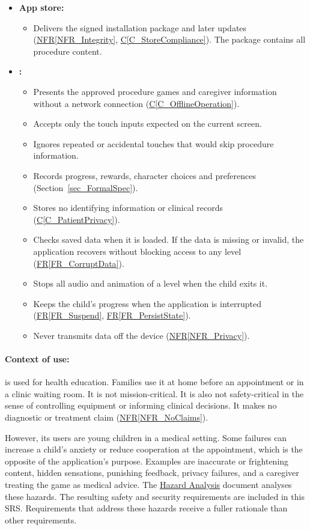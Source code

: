 \documentclass[10pt]{article}
\makeatletter
\newcommand{\conref}[1]{\hyperref[#1]{C\ref*{#1}}}
\newcommand{\termsecnum}{\ifnum\value{subsection}=0 \thesection\else\thesubsection\fi}
\newcommand{\termmark}[1]{%
  \hypertarget{term:#1}{}%
  \protected@write\@auxout{}{\string\newlabel{termsec:#1}{{\termsecnum}{\thepage}{}{}{}}}%
}
\newcommand{\rref}[1]{\hyperref[#1]{FR\ref*{#1}}}
\newcommand{\nfrref}[1]{\hyperref[#1]{NFR\ref*{#1}}}
\newcommand{\haurl}{https://team-hindsight.github.io/ophthamology-game/HazardAnalysis/HazardAnalysis.pdf}
\newcommand{\hadoc}[1]{\href{\haurl}{#1}}
\makeatother
\begin{document}
\begin{itemize}
\item \textbf{App store:}
  \begin{itemize}
  \item Delivers the signed installation package and later updates
    (\nfrref{NFR_Integrity}, \conref{C_StoreCompliance}). The package contains
    all procedure content.
  \end{itemize}

\item \textbf{\progname{}:}
  \begin{itemize}
  \item Presents the approved procedure games and caregiver information without
    a network connection (\conref{C_OfflineOperation}).
  \item Accepts only the touch inputs expected on the current screen.
  \item Ignores repeated or accidental touches that would skip procedure
    information.
  \item Records progress, rewards, character choices and preferences
    (Section~\ref{sec_FormalSpec}).
  \item Stores no identifying information or clinical records
    (\conref{C_PatientPrivacy}).
  \item Checks saved data when it is loaded. If the data is missing or invalid,
    the application recovers without blocking access to any level
    (\rref{FR_CorruptData}).
  \item Stops all audio and animation of a level when the child exits it.
  \item Keeps the child's progress when the application is interrupted
    (\rref{FR_Suspend}, \rref{FR_PersistState}).
  \item Never transmits data off the device (\nfrref{NFR_Privacy}).
  \end{itemize}
\end{itemize}

\paragraph{Context of use:} \progname{} is used for health education. Families
use it at home before an appointment or in a clinic waiting room. It is not
mission-critical. It is also not safety-critical in the sense of controlling
equipment or informing clinical decisions. It makes no diagnostic or treatment
claim (\nfrref{NFR_NoClaims}).

However, its users are young children in a medical setting. Some failures can
increase a child's anxiety or reduce cooperation at the appointment, which is
the opposite of the application's purpose. Examples are inaccurate or
frightening content, hidden sensations, punishing feedback, \termmark{privacy}privacy failures,
and a caregiver treating the game as medical advice. The
\hadoc{Hazard Analysis} document analyses these hazards. The resulting safety and security requirements
are included in this SRS. Requirements that address these hazards receive a
fuller rationale than other requirements.
\end{document}
